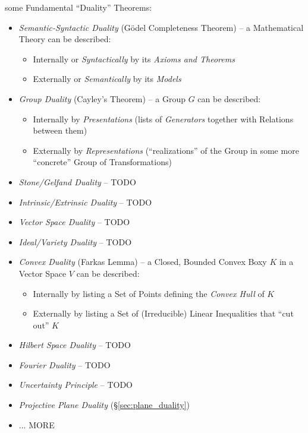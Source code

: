 some Fundamental ``Duality'' Theorems:
\begin{itemize}
  \item \emph{Semantic-Syntactic Duality} (G\"odel Completeness Theorem) --
    a Mathematical Theory can be described:
    \begin{itemize}
      \item Internally or \emph{Syntactically} by its \emph{Axioms and Theorems}
      \item Externally or \emph{Semantically} by its \emph{Models}
    \end{itemize}
  \item \emph{Group Duality} (Cayley's Theorem) -- a Group $G$ can be
    described:
    \begin{itemize}
      \item Internally by \emph{Presentations} (lists of \emph{Generators}
        together with Relations between them)
      \item Externally by \emph{Representations} (``realizations'' of the Group
        in some more ``concrete'' Group of Transformations)
    \end{itemize}

  \item \emph{Stone/Gelfand Duality} -- TODO

  \item \emph{Intrinsic/Extrinsic Duality} -- TODO

  \item \emph{Vector Space Duality} -- TODO

  \item \emph{Ideal/Variety Duality} -- TODO

  \item \emph{Convex Duality} (Farkas Lemma) -- a Closed, Bounded Convex Boxy
    $K$ in a Vector Space $V$ can be described:
    \begin{itemize}
      \item Internally by listing a Set of Points defining the \emph{Convex
        Hull} of $K$
      \item Externally by listing a Set of (Irreducible) Linear Inequalities
        that ``cut out'' $K$
    \end{itemize}

  \item \emph{Hilbert Space Duality} -- TODO

  \item \emph{Fourier Duality} -- TODO

  \item \emph{Uncertainty Principle} -- TODO

  \item \emph{Projective Plane Duality} (\S\ref{sec:plane_duality})

  \item ... MORE
\end{itemize}

